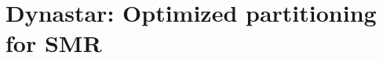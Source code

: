 \chapter[Dynastar: Optimized partitioning for SMR]{Dynastar: Optimized partitioning for SMR}
\label{sec:dynastar}









